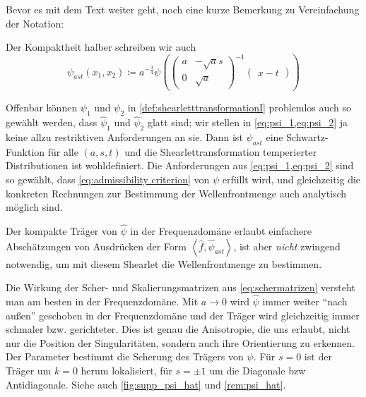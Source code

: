 Bevor es mit dem Text weiter geht, noch eine kurze Bemerkung zu Vereinfachung der Notation:

\begin{remark}[Notation]
    Der Kompaktheit halber schreiben wir auch
    \begin{equation*}
        \psi_{ast} (x_1,x_2) \coloneqq
        a^{-\frac{3}{4}} \psi\left(
    \left(\begin{smallmatrix}
        a & -\sqrt a s \\ 0 & \sqrt a
    \end{smallmatrix}\right)^{-1}
    \left(\begin{smallmatrix}
        x-t
    \end{smallmatrix}\right)
    \right)
    \end{equation*}
\end{remark}

Offenbar können $\psi_1$ und $\psi_2$ in \cref{def:shearletttransformationI} problemlos auch so gewählt werden, dass $\hat\psi_1$ und $\hat\psi_2$ glatt sind; wir stellen in \cref{eq:psi_1,eq:psi_2} ja keine allzu restriktiven Anforderungen an sie. Dann ist $\psi_{ast}$ eine Schwartz-Funktion für alle $(a,s,t)$ und die Shearlettransformation temperierter Distributionen ist wohldefiniert.  Die Anforderungen aus \cref{eq:psi_1,eq:psi_2} sind so gewählt, dass \cref{eq:admissibility criterion} von $\psi$ erfüllt wird, und gleichzeitig die konkreten Rechnungen zur Bestimmung der Wellenfrontmenge auch analytisch möglich sind.

Der kompakte Träger von $\hat\psi$ in der Frequenzdomäne erlaubt einfachere
Abschätzungen von Ausdrücken der Form $\left<\hat f, \hat \psi_{ast}\right>$, ist aber \emph{nicht} zwingend notwendig, um mit diesem Shearlet die Wellenfrontmenge zu bestimmen.


Die Wirkung der Scher- und Skalierungsmatrizen aus \cref{eq:schermatrizen} versteht man am besten in der Frequenzdomäne. Mit $a \to 0$ wird $\hat \psi$ immer weiter "`nach außen"' geschoben in der Frequenzdomäne und der Träger wird gleichzeitig immer schmaler bzw. gerichteter. Dies ist genau die Anisotropie, die uns erlaubt, nicht nur die Position der Singularitäten, sondern auch ihre Orientierung zu erkennen. Der Parameter bestimmt die Scherung des Trägers von $\psi$. Für $s=0$ ist der Träger um $k=0$ herum lokalisiert, für $s = \pm 1$ um die Diagonale bzw Antidiagonale. Siehe auch \cref{fig:supp_psi_hat} und \cref{rem:psi_hat}.


